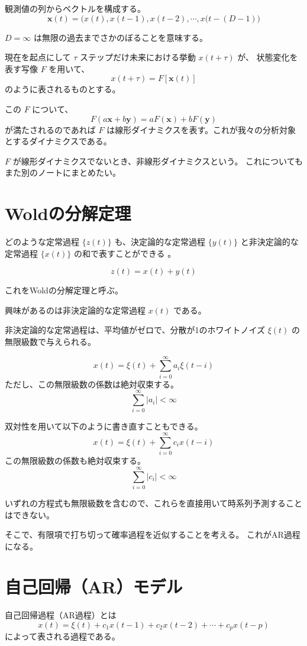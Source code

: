 \documentclass[uplatex,a4j,12pt,dvipdfmx]{jsarticle}
\begin{document}
観測値の列からベクトルを構成する。
\[
	\mathbf{x}(t) = \Big( x(t), x(t-1) , x(t-2) , \cdots , x(t -(D-1) \Big)
\]

$D = \infty$ は無限の過去までさかのぼることを意味する。

現在を起点にして $\tau$ ステップだけ未来における挙動 $x(t+\tau)$ が、
状態変化を表す写像 $F$ を用いて、
\[
	x(t+\tau) = F[ \mathbf{x}(t) ]
\]
のように表されるものとする。

この $F$ について、
\[
	F(a \mathbf{x} + b \mathbf{y}) =
	a F(\mathbf{x}) + b F(\mathbf{y})
\]
が満たされるのであれば $F$ は線形ダイナミクスを表す。これが我々の分析対象とするダイナミクスである。

$F$ が線形ダイナミクスでないとき、非線形ダイナミクスという。
これについてもまた別のノートにまとめたい。


\section{Woldの分解定理}

どのような定常過程
$\{ z(t) \}$
も、決定論的な定常過程
$\{ y(t) \}$
と非決定論的な定常過程
$\{ x(t) \}$
の和で表すことができる
\cite{BoxJenkins1994}
。

\[
	z(t) = x(t) + y(t)
\]


これをWoldの分解定理と呼ぶ。

興味があるのは非決定論的な定常過程 $x(t)$ である。


非決定論的な定常過程は、平均値がゼロで、分散が1のホワイトノイズ $\xi(t)$ の無限級数で与えられる。

\[
	x(t) = \xi(t) + \sum^{\infty}_{i=0} a_{i} \xi(t-i)
\]
ただし、この無限級数の係数は絶対収束する。
\[
	\sum^{\infty}_{i=0} |a_{i}| < \infty
\]

双対性を用いて以下のように書き直すこともできる。
\[
	x(t) = \xi(t) + \sum^{\infty}_{i=0} c_{i} x(t-i)
\]
この無限級数の係数も絶対収束する。
\[
	\sum^{\infty}_{i=0} |c_{i}| < \infty
\]

いずれの方程式も無限級数を含むので、これらを直接用いて時系列予測することはできない。

そこで、有限項で打ち切って確率過程を近似することを考える。
これがAR過程になる。

\section{自己回帰（AR）モデル}

自己回帰過程（AR過程）とは
\[
	x(t) = \xi(t) + c_{1} x(t-1) + c_{2} x(t-2) + \cdots + c_{p} x(t-p)
\]
によって表される過程である。
\end{document}
